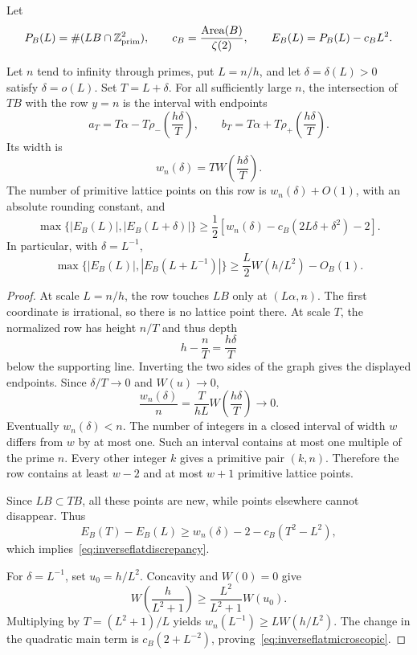 Let
\[
 P_B(L)=\#(LB\cap\mathbb Z^2_{\rm prim}),\qquad
 c_B=\frac{\operatorname{Area}(B)}{\zeta(2)},\qquad
 E_B(L)=P_B(L)-c_BL^2.
\]

\begin{proposition}
\label{prop:inverseflatrow}
Let $n$ tend to infinity through primes, put $L=n/h$, and let
$\delta=\delta(L)>0$ satisfy $\delta=o(L)$. Set $T=L+\delta$.
For all sufficiently large $n$, the intersection of $TB$ with the row
$y=n$ is the interval with endpoints
\[
 a_T=T\alpha-T\rho_-\!\left(\frac{h\delta}{T}\right),\qquad
 b_T=T\alpha+T\rho_+\!\left(\frac{h\delta}{T}\right).
\]
Its width is
\begin{equation}
 w_n(\delta)=T W\!\left(\frac{h\delta}{T}\right).
 \label{eq:inverseflatwidth}
\end{equation}
The number of primitive lattice points on this row is $w_n(\delta)+O(1)$,
with an absolute rounding constant, and
\begin{equation}
 \max\{|E_B(L)|,|E_B(L+\delta)|\}
 \geq\frac12\left[
 w_n(\delta)-c_B(2L\delta+\delta^2)-2\right].
 \label{eq:inverseflatdiscrepancy}
\end{equation}
In particular, with $\delta=L^{-1}$,
\begin{equation}
 \max\{|E_B(L)|,|E_B(L+L^{-1})|\}
 \geq\frac L2W(h/L^2)-O_B(1).
 \label{eq:inverseflatmicroscopic}
\end{equation}
\end{proposition}

\begin{proof}
At scale $L=n/h$, the row touches $LB$ only at $(L\alpha,n)$.
The first coordinate is irrational, so there is no lattice point there.
At scale $T$, the normalized row has height $n/T$ and thus depth
\[
 h-\frac nT=\frac{h\delta}{T}
\]
below the supporting line. Inverting the two sides of the graph gives
the displayed endpoints. Since $\delta/T\to0$ and $W(u)\to0$,
\[
 \frac{w_n(\delta)}n=\frac{T}{hL}
 W\!\left(\frac{h\delta}{T}\right)\longrightarrow0.
\]
Eventually $w_n(\delta)<n$. The number of integers in a closed interval
of width $w$ differs from $w$ by at most one. Such an interval contains
at most one multiple of the prime $n$. Every other integer $k$ gives a
primitive pair $(k,n)$. Therefore the row contains at least $w-2$ and
at most $w+1$ primitive lattice points.

Since $LB\subset TB$, all these points are new, while points elsewhere
cannot disappear. Thus
\[
 E_B(T)-E_B(L)
 \geq w_n(\delta)-2-c_B(T^2-L^2),
\]
which implies~\eqref{eq:inverseflatdiscrepancy}.

For $\delta=L^{-1}$, set $u_0=h/L^2$. Concavity and $W(0)=0$ give
\[
 W\!\left(\frac h{L^2+1}\right)
 \geq\frac{L^2}{L^2+1}W(u_0).
\]
Multiplying by $T=(L^2+1)/L$ yields
$w_n(L^{-1})\geq LW(h/L^2)$. The change in the quadratic main term
is $c_B(2+L^{-2})$, proving~\eqref{eq:inverseflatmicroscopic}.
\end{proof}

